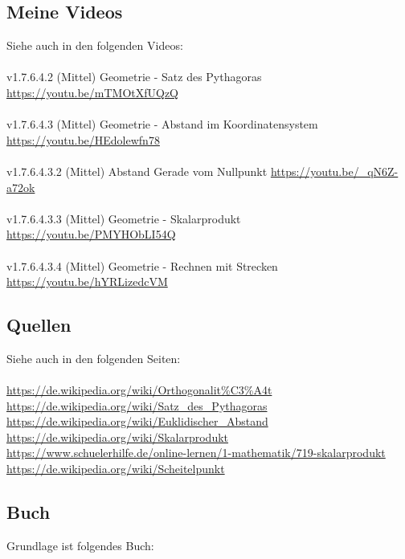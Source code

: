 \documentclass[a4paper]{amsart}
\theoremstyle{definition}
\begin{document}
\subsection*{Meine Videos}
Siehe auch in den folgenden Videos:\\
\\
v1.7.6.4.2 (Mittel) Geometrie - Satz des Pythagoras\\
\url{https://youtu.be/mTMOtXfUQzQ}\\
\\
v1.7.6.4.3 (Mittel) Geometrie - Abstand im Koordinatensystem\\
\url{https://youtu.be/HEdolewfn78}
\\
\\v1.7.6.4.3.2 (Mittel) Abstand Gerade vom Nullpunkt
\url{https://youtu.be/_qN6Z-a72ok}
\\
\\v1.7.6.4.3.3 (Mittel) Geometrie - Skalarprodukt
\url{https://youtu.be/PMYHObLI54Q}
\\
\\v1.7.6.4.3.4 (Mittel) Geometrie - Rechnen mit Strecken
\url{https://youtu.be/hYRLizedcVM}

\subsection*{Quellen}
Siehe auch in den folgenden Seiten:\\
\\
\url{https://de.wikipedia.org/wiki/Orthogonalit%C3%A4t}\\
\url{https://de.wikipedia.org/wiki/Satz_des_Pythagoras}\\
\url{https://de.wikipedia.org/wiki/Euklidischer_Abstand}\\
\url{https://de.wikipedia.org/wiki/Skalarprodukt}\\
\url{https://www.schuelerhilfe.de/online-lernen/1-mathematik/719-skalarprodukt}\\
\url{https://de.wikipedia.org/wiki/Scheitelpunkt}

\subsection*{Buch}
Grundlage ist folgendes Buch:\\
\end{document}
